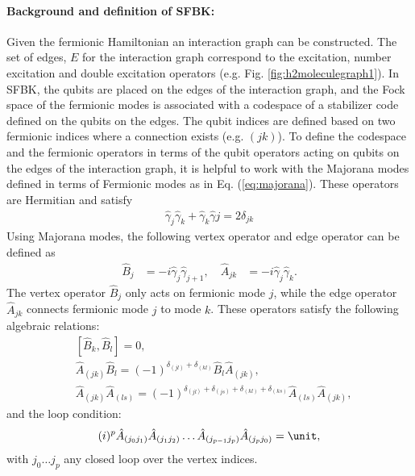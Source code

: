 \paragraph{Background and definition of SFBK:}
Given the fermionic Hamiltonian an interaction graph can be constructed. The set of edges, $E$ for the interaction graph correspond to the excitation, number excitation and double excitation operators (e.g. Fig. \ref{fig:h2moleculegraph1}). In SFBK, the qubits are placed on the edges of the interaction graph, and the Fock space of the fermionic modes is associated with a codespace of a stabilizer code defined on the qubits on the edges. The qubit indices are defined based on two fermionic indices where a connection exists (e.g. $(jk)$). To define the codespace and the fermionic operators in terms of the qubit operators acting on qubits on the edges of the interaction graph, it is helpful to work with the Majorana modes defined in terms of Fermionic modes as in Eq. (\ref{eq:majorana}). These operators are Hermitian and satisfy
\begin{align}
\hat{\gamma}_{j}\hat{\gamma}_{k}+\hat{\gamma}_{k}\hat{\gamma}{j}=2\delta_{jk} \label{eq:Maj_modes}
\end{align}
Using Majorana modes, the following vertex operator and edge operator can be defined as
\begin{equation}
\begin{aligned}
\hat{B}_j &= -i \hat{\gamma}_j\hat{\gamma}_{j+1}, \quad
\hat{A}_{jk} &= -i\hat{\gamma}_j\hat{\gamma}_k.
\end{aligned}
\end{equation}
The vertex operator $\hat{B}_j$ only acts on fermionic mode $j$, while the edge operator $\hat{A}_{jk}$ connects fermionic mode $j$ to mode $k$. These operators satisfy the following algebraic relations:
\begin{align} \label{eq:algebra_sfbk_bb}
&\left[ \hat{B}_k, \hat{B}_l \right] = 0,\\
&\hat{A}_{(jk)}\hat{B}_l = (-1)^{\delta_{(jl)} + \delta_{(kl)}} \hat{B}_l \hat{A}_{(jk)}, \label{eq:algebra_sfbk_ab} \\
&\hat{A}_{(jk)}\hat{A}_{(ls)} =  (-1)^{\delta_{(jl)} + \delta_{(js)} + \delta_{(kl)} + \delta_{(ks)}}\hat{A}_{(ls)}\hat{A}_{(jk)}, \label{eq:algebra_sfbk_aa}
\end{align}
and the loop condition:
\begin{align} \label{eq:sfbk_loop}
(i)^{p} \hat{A}_{(j_0 j_1)}\hat{A}_{(j_1 j_2)} \dots \hat{A}_{(j_{p-1} j_p)}\hat{A}_{(j_p j_0)} = \unit,
\end{align}
with $j_0 \dots j_p$ any closed loop over the vertex indices.

